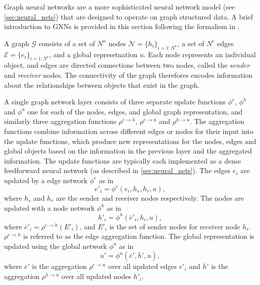 Graph neural networks are a more sophisticated neural network model (see \cref{sec:neural_nets}) that are designed to operate on graph structured data.
A brief introduction to GNNs is provided in this section following the formalism in .

A graph $\mathcal{G}$ consists of a set of $N^n$ nodes $\mathcal{N} = \{h_i\}_{i=1:N^n}$, a set of $N^e$ edges $\mathcal{E} = \{e_i\}_{i=1:N^e}$, and a global represetnation $u$.
Each node represents an individual object, and edges are directed connections between two nodes, called the \textit{sender} and \textit{receiver} nodes.
The connectivity of the graph therefores encodes information about the relationships between objects that exist in the graph.

A single graph network layer consists of three separate update functions $\phi^e$, $\phi^h$ and $\phi^u$ one for each of the nodes, edges, and global graph representation, and similarly three aggregation functions $\rho^{e \rightarrow h}$, $\rho^{e \rightarrow u}$ and $\rho^{h \rightarrow u}$.
The aggregation functions combine information across different edges or nodes for their input into the update functions, which produce new representations for the nodes, edges and global objects based on the information in the previous layer and the aggregated information.
The update functions are typically each implemented as a dense feedforward neural network (as described in \cref{sec:neural_nets}).
The edges $e_i$ are updated by a edge network $\phi^e$ as in 
%
\begin{equation}
    e'_i = \phi^e (e_i, h_s, h_r, u) , 
\end{equation}
%
where $h_s$ and $h_r$ are the sender and receiver nodes respectively.
The nodes are updated with a node network $\phi^h$ as in
%
\begin{equation}
    h'_i = \phi^h (\overline{e}'_i, h_i, u) , 
\end{equation}
%
where $\overline{e}'_i = \rho^{e \rightarrow h}(E'_i)$, and $E'_i$ is the set of sender nodes for receiver node $h_i$.
$\rho^{e \rightarrow h}$ is referred to as the edge aggregation function.
The global representation is updated using the global network $\phi^u$ as in
%
\begin{equation}
    u' = \phi^u (\overline{e}', \overline{h}', u),
\end{equation}
%
where $\overline{e}'$ is the aggregation $\rho^{e \rightarrow u}$ over all updated edges $e'_i$ and $\overline{h}'$ is the aggregation $\rho^{h \rightarrow u}$ over all updated nodes $h'_i$.

